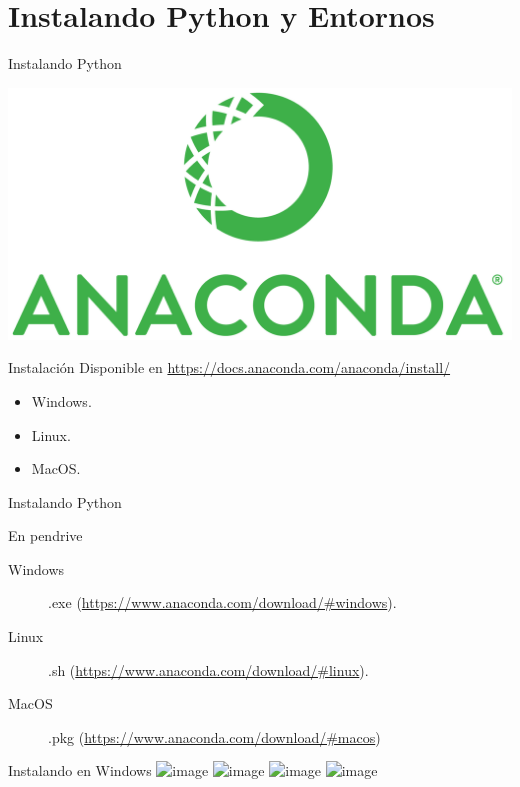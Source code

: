 \documentclass[bigger,unknownkeysallowed]{beamer}
\begin{document}
\section{Instalando Python y Entornos}
\label{sec:org9a7215a}

\begin{frame}[label={sec:org6b84d44}]{Instalando Python}
\begin{center}
\begin{center}
\includegraphics[width=.4\textwidth]{logo-anaconda.png}
\end{center}
\end{center}

\begin{block}{Instalación}
Disponible en \url{https://docs.anaconda.com/anaconda/install/}

\begin{itemize}
\item Windows.

\item Linux.

\item MacOS.
\end{itemize}
\end{block}
\end{frame}

\begin{frame}[label={sec:orgf06e69b}]{Instalando Python}
\begin{exampleblock}{En pendrive}
\begin{description}
\item[{Windows}] .exe (\url{https://www.anaconda.com/download/\#windows}).
\item[{Linux}] .sh (\url{https://www.anaconda.com/download/\#linux}).
\item[{MacOS}] .pkg (\url{https://www.anaconda.com/download/\#macos})
\end{description}
\end{exampleblock}
\end{frame}

\begin{frame}[label={sec:org3e6d6b4}]{Instalando en Windows}
\includegraphics<1>[width=.9\textwidth]{install_win1.png}
\includegraphics<2>[width=.9\textwidth]{install_win2.png}
\includegraphics<3>[width=.9\textwidth]{install_win3.png}
\includegraphics<4>[width=.9\textwidth]{install_win4.png}
\end{frame}
\end{document}
